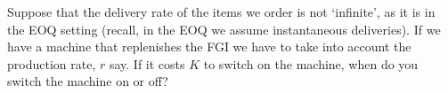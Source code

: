 \begin{exercise}
  Suppose that the delivery rate of the items we order is not
  `infinite', as it is in the EOQ setting (recall, in the EOQ we
  assume instantaneous deliveries). If we have a machine that
  replenishes the FGI we have to take into account the production
  rate, $r$ say. If it costs $K$ to switch on the machine, when do you switch the machine on or off?
  \begin{comment}
    An easy policy is to switch the machine on when the FGI level hits
    some level $Q$, and switch it off when the level is $0$. Of course
    we need to assume that $D<r$, i.e., the production rate is larger
    than the demand rate $D$. 

    To find an expression to cover this situation we can reason like
    this.  When the machine is on, inventory increases at rate
    $r-D$. If we keep it on for $T$ time units, then the inventory
    level is $T(r-D)$ when we switch off. The time until the inventory
    hits 0 is then $T(r-D)/D$, since we start with an inventory level
    $T(r-D)$ after switching off and the demand rate is $D$. Thus, the total cycle length is
    \begin{equation*}
      T + \frac{T(r-D)}D = T + T(\frac{r}D-1) = T + T\frac r D - T = T\frac r D.
    \end{equation*}

    What is, in the EOQ, the average inventory cost? It is half the
    maximal height times $h$, i.e., $hQ/2$. In our present case, the
    maximal height is $T(r-D)$. Thus the average inventory cost must
    be  $hT(r-D)/2$. 

    The ordering cost in the EOQ is $A$ times the order frequency, i.e., $A D/Q$. Here the time between two `order' moments (switching moments) is $Tr/D$. Hence, the frequency is $D/rT$ and the average switching cost is $K D/rT$. 

All in all we get for the average cost
\begin{equation*}
  \frac{h(r-D)}2 T + \frac{K}r \frac DT.
\end{equation*}
This is similar to the EOQ model with $h'=h(r-D)$ and $A=K/r$. But then the optimal $T$ must be given by
\begin{equation*}
  T = \sqrt{\frac{2AD}{h'}} = \sqrt{\frac{2DK/r}{h(r-D)}}=\sqrt{\frac{2DK}{hr(r-D)}}.
\end{equation*}
  \end{comment}
\end{exercise}


